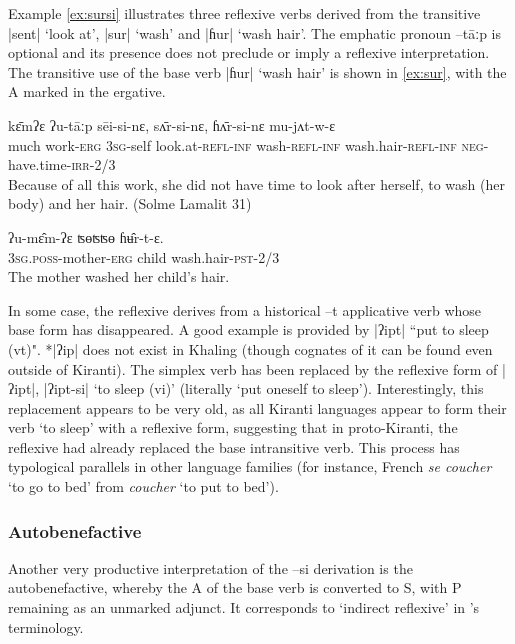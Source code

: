 \documentclass[twoside,a4paper,11pt]{article}
\newcommand{\ipa}[1]{{\phon#1}}
\begin{document}
Example \ref{ex:sursi} illustrates three reflexive verbs derived from the transitive |\ipa{sent}| `look at', |\ipa{sur}| `wash' and |\ipa{ɦur}| `wash hair'. The emphatic pronoun \ipa{--tāːp} is optional and its presence does not preclude or imply a reflexive interpretation. The transitive use of the base verb |\ipa{ɦur}| `wash hair'  is shown in \ref{ex:sur}, with the A marked in the ergative.

\begin{exe}
\ex \label{ex:sursi}
\gll \ipa{gʰole}  	\ipa{kɛ̄mʔɛ}  	\ipa{ʔu-tāːp}  	\ipa{sēi-si-nɛ,}  	\ipa{sʌ̄r-si-nɛ,}  	\ipa{ɦʌ̄r-si-nɛ}  	\ipa{mu-jʌt-w-ɛ}  \\
much work-\textsc{erg} \textsc{3sg}-self  look.at\textsc{-refl-inf} wash\textsc{-refl-inf} wash.hair\textsc{-refl-inf} \textsc{neg}-have.time-\textsc{irr-2/3} \\
\glt Because of all this work, she did not have time to look after herself, to wash (her body) and her hair. (Solme Lamalit 31)
\end{exe}

\begin{exe}
\ex \label{ex:sur}
\gll
 \ipa{ʔu-mɛ̂m-ʔɛ}  	\ipa{ʦɵʦʦɵ}  	\ipa{ɦʉ̂r-t-ɛ.}  \\
\textsc{3sg.poss}-mother-\textsc{erg} child wash.hair-\textsc{pst-2/3} \\
\glt The mother washed her child's hair.
\end{exe}
 
 In some case, the reflexive derives from a historical \ipa{--t} applicative verb whose base form has disappeared. A good example is provided by |ʔipt| ``put to sleep (vt)".  *|ʔip| does not exist in Khaling (though cognates of it can be found even outside of Kiranti). The simplex verb has been replaced by the reflexive form of |ʔipt|, |ʔipt-si| `to sleep (vi)' (literally `put oneself to sleep'). Interestingly, this replacement appears to be very old, as all Kiranti languages appear to form their verb `to sleep' with a reflexive form, suggesting that in proto-Kiranti,  the reflexive had already replaced the base intransitive verb. This process has typological parallels in other language families (for instance, French \textit{se coucher} `to go to bed' from \textit{coucher} `to put to bed').
 
\subsubsection{Autobenefactive}

Another very productive interpretation of the  \ipa{--si} derivation is the autobenefactive, whereby the A of the base verb is converted to S, with  P remaining as an unmarked adjunct.   It corresponds to  `indirect reflexive' in \citet{kemmer93middle}'s terminology.
 
\end{document}
